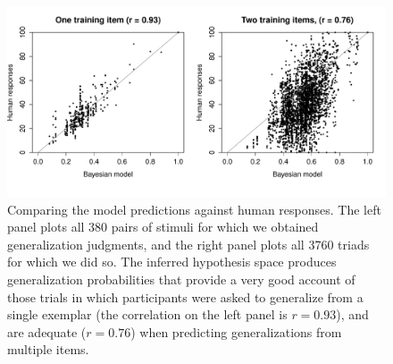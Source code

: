 \begin{figure}[p]
\begin{center}
	\includegraphics[width=14cm]{generalization_figs/allitems.pdf}
\vspace*{12pt}
\caption{Comparing the model predictions against human responses. The left panel plots all 380 pairs of stimuli for which we obtained generalization judgments, and the right panel plots all 3760 triads for which we did so. The inferred hypothesis space produces generalization probabilities that provide a very good account of those trials in which participants were asked to generalize from a single exemplar (the correlation on the left panel is $r=0.93$), and are adequate ($r=0.76$) when predicting generalizations from multiple items.}
\label{fig:gen_fit}
\end{center}
\end{figure}




%



